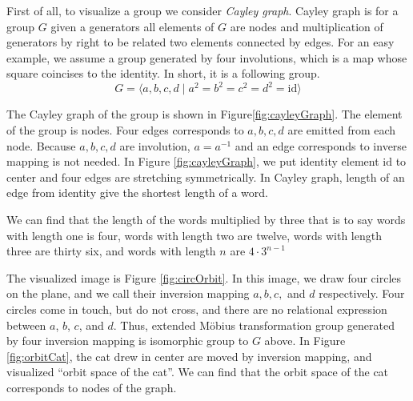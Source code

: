 First of all, to visualize a group we consider \textit{Cayley graph}.
Cayley graph is for a group $G$ given a generators
all elements of $G$ are nodes and multiplication of generators by
right to be related two elements connected by edges.
For an easy example, we assume a group generated by four
involutions, which is a map whose square coincises to the identity.
In short, it is a following group.
\[ G=\langle a,b,c,d \mid a^2=b^2=c^2=d^2 = \mathrm{id} \rangle \]

The Cayley graph of the group is shown in Figure\ref{fig:cayleyGraph}.
The element of the group is nodes. Four edges corresponds to 
$a, b, c, d$ are emitted from each node.
Because $a, b, c, d$ are involution, $a=a^{-1}$ and
an edge corresponds to inverse mapping is not needed.
In Figure \ref{fig:cayleyGraph}, we put identity element $\mathrm{id}$
to center and four edges are stretching symmetrically.
In Cayley graph, length of an edge from identity give the shortest
length of a word.

We can find that the length of the words multiplied by three
that is to say words with length one is four, words with length two are
twelve, words with length three are thirty six, and words with length
$n$ are $4 \cdot 3^{n-1}$

The visualized image is Figure \ref{fig:circOrbit}. In this image,
we draw four circles on the plane, and we call their inversion mapping
$a, b, c,$ and $ d$ respectively. Four circles come in touch, but do not cross,
and there are no relational expression between $a$, $b$, $c$, and $d$.
Thus, extended M\"obius transformation group generated by four inversion
mapping is isomorphic group to $G$ above.
In Figure \ref{fig:orbitCat}, the cat drew in center are moved by
inversion mapping, and visualized ``orbit space of the cat''.
We can find that the orbit space of the cat corresponds to nodes of
the graph.

